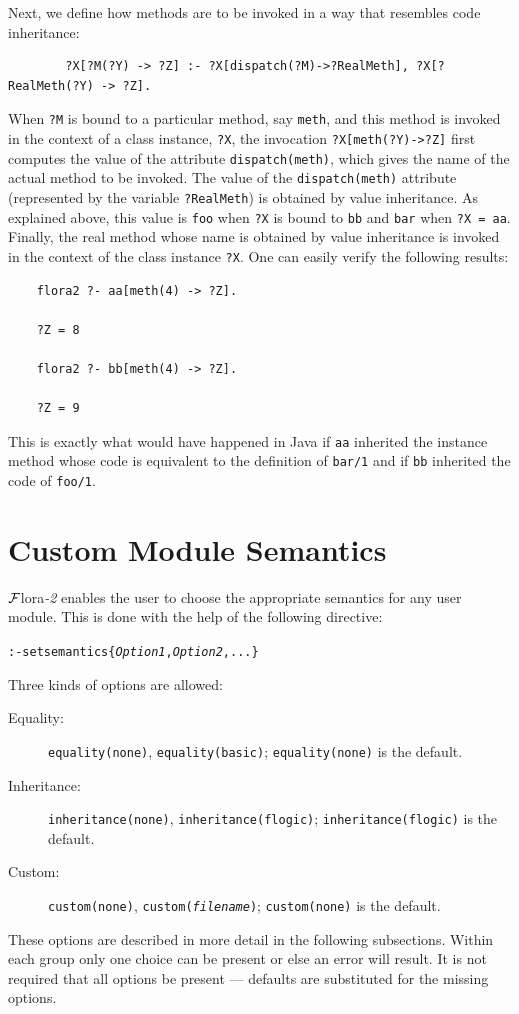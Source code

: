 \documentclass[11pt]{article}
\newcommand{\FLORA}{{\mbox{\sc ${\cal F}${lora}\rm\emph{-2}}}\xspace}
\begin{document}
Next, we define how methods are to be invoked in a way that resembles
code inheritance:
\begin{verbatim}
        ?X[?M(?Y) -> ?Z] :- ?X[dispatch(?M)->?RealMeth], ?X[?RealMeth(?Y) -> ?Z].
\end{verbatim}
When {\tt ?M} is bound to a particular method, say {\tt meth}, and this
method is invoked in the context of a class instance, {\tt ?X}, the
invocation {\tt ?X[meth(?Y)->?Z]} first computes the value of the attribute
{\tt dispatch(meth)}, which gives the name of the actual method to be
invoked. The value of the {\tt dispatch(meth)} attribute (represented by
the variable {\tt ?RealMeth}) is obtained by
value inheritance.  As explained above, this value is
{\tt foo} when {\tt ?X} is bound to {\tt bb} and {\tt bar} when {\tt ?X =
  aa}.  Finally, the real method whose name is obtained by value
inheritance is invoked in the context of the class instance {\tt ?X}.  One
can easily verify the following results:
\begin{verbatim}
    flora2 ?- aa[meth(4) -> ?Z].

    ?Z = 8

    flora2 ?- bb[meth(4) -> ?Z].

    ?Z = 9
\end{verbatim}
This is exactly what would have happened in Java if {\tt aa} inherited
the instance method whose code is equivalent to the definition of
{\tt bar/1} and if {\tt bb} inherited the code of {\tt foo/1}.  


\section{Custom Module Semantics}\label{sec-semantics-directive}

\FLORA enables the user to choose the appropriate semantics for any user
module. This is done with the help of the following directive:
\begin{alltt}
  :- setsemantics\{\emph{Option1}, \emph{Option2}, ...\}
\end{alltt}
Three kinds of options are allowed:
\begin{description}
  \item[Equality:]  {\tt equality(none)}, {\tt equality(basic)};
  {\tt equality(none)} is the default.
\item[Inheritance:] {\tt inheritance(none)}, {\tt inheritance(flogic)};
  {\tt inheritance(flogic)} is the default.
\item[Custom:] {\tt custom(none)}, {\tt custom(\emph{filename})};
  {\tt custom(none)} is the default.
\end{description}
These options are described in more detail in the following
subsections.
Within each group only one choice can be present or else an error will result.
It is not required that all options be present --- defaults are substituted
for the missing options.
\end{document}
